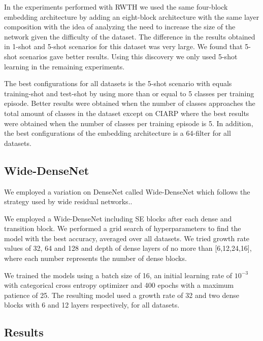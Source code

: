 In the experiments performed with RWTH we used the same four-block embedding architecture by adding an eight-block architecture with the same layer composition with the idea of analyzing the need to increase the size of the network given the difficulty of the dataset. The difference in the results obtained in 1-shot and 5-shot scenarios for this dataset was very large. We found that 5-shot scenarios gave better results. Using this discovery we only used 5-shot learning in the remaining experiments.

The best configurations for all datasets is the 5-shot scenario with equals training-shot and test-shot by using more than or equal to 5 classes per training episode. Better results were obtained when the number of classes approaches the total amount of classes in the dataset except on CIARP where the best results were obtained when the number of classes per training episode is 5. In addition, the best configurations of the embedding architecture is a 64-filter for all datasets.

\subsection{Wide-DenseNet}

We employed a variation on DenseNet called Wide-DenseNet which follows the strategy used by wide residual networks.\cite{He2015DeepRL}.

We employed a Wide-DenseNet including SE blocks after each dense and transition block. We performed a grid search of hyperparameters to find the model with the best accuracy, averaged over all datasets. We tried growth rate values of 32, 64 and 128 and depth of dense layers of no more than [6,12,24,16], where each number represents the number of dense blocks.

We trained the models using a batch size of 16, an initial learning rate of $10^{-3}$ with categorical cross entropy optimizer and 400 epochs with a maximum patience of 25. The resulting model used a growth rate of 32 and two dense blocks with 6 and 12 layers respectively,  for all datasets.

\subsection{Results}

